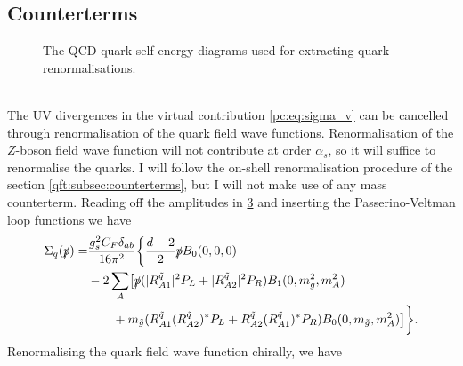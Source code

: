 \documentclass[../main.tex]{subfiles}
\begin{document}
\subsection{Counterterms}
\begin{figure}[ht!]
  \centering
  \begin{subfigure}{.49\textwidth}
    \centering
    \caption{}
    \label{pc:subfig:quarkSE_gluon}
  \end{subfigure}
  \begin{subfigure}{.49\textwidth}
    \centering
    \caption{}
    \label{pc:subfig:quarkSE_gluino}
  \end{subfigure}
  \caption{The QCD quark self-energy diagrams used for extracting quark renormalisations.}
  \label{pc:fig:quarkSE}
\end{figure}
\\
The UV divergences in the virtual contribution \cref{pc:eq:sigma_v} can be cancelled through renormalisation of the quark field wave functions.
Renormalisation of the \(Z\)-boson field wave function will not contribute at order \(\alpha_s\), so it will suffice to renormalise the quarks.
I will follow the on-shell renormalisation procedure of the section \cref{qft:subsec:counterterms}, but I will not make use of any mass counterterm.
Reading off the amplitudes in \cref{pc:fig:quarkSE} and inserting the Passerino-Veltman loop functions we have
\begin{align}
  \label{pc:eq:quarkSE}
  \nonumber
  \Sigma_q(\slashed{p}) = & \frac{g_s^2 C_F \delta_{ab}}{16\pi^2} \biggl\{
  \frac{d-2}{2} \slashed{p} B_0(0,0,0)                                                                                                                                                \\
  \nonumber
                          & - 2\sum_A \bigl[
  \slashed{p} (|R^{\tilde{q}}_{A1}|^2P_L + |R^{\tilde{q}}_{A2}|^2P_R)B_1(0,m_{\tilde{g}}^2,m_A^2)                                                                                     \\
                          & \qquad + m_{\tilde{g}} (R^{\tilde{q}}_{A1} (R^{\tilde{q}}_{A2})^\ast P_L + R^{\tilde{q}}_{A2} (R^{\tilde{q}}_{A1})^\ast P_R) B_0(0, m_{\tilde{g}}, m_A^2)
  \bigr]\biggr\}.
\end{align}
Renormalising the quark field wave function chirally, we have
\end{document}
